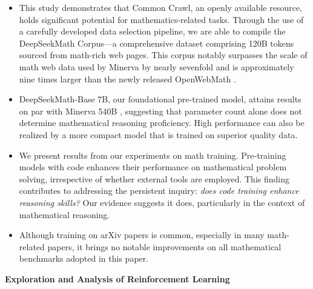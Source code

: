 \begin{itemize}[topsep=0pt]
    \item This study demonstrates that Common Crawl, an openly available resource, holds significant potential for mathematics-related tasks. Through the use of a carefully developed data selection pipeline, we are able to compile the DeepSeekMath Corpus—a comprehensive dataset comprising 120B tokens sourced from math-rich web pages. This corpus notably surpasses the scale of math web data used by Minerva \citep{minerva} by nearly sevenfold and is approximately nine times larger than the newly released OpenWebMath \citep{openwebmath}.

\item DeepSeekMath-Base 7B, our foundational pre-trained model, attains results on par with Minerva 540B \citep{minerva}, suggesting that parameter count alone does not determine mathematical reasoning proficiency. High performance can also be realized by a more compact model that is trained on superior quality data.

\item We present results from our experiments on math training. Pre-training models with code enhances their performance on mathematical problem solving, irrespective of whether external tools are employed. This finding contributes to addressing the persistent inquiry: \textit{does code training enhance reasoning skills?} Our evidence suggests it does, particularly in the context of mathematical reasoning.

    \item Although training on arXiv papers is common, especially in many math-related papers, it brings no notable improvements on all mathematical benchmarks adopted in this paper.
\end{itemize}

\textbf{Exploration and Analysis of Reinforcement Learning}

